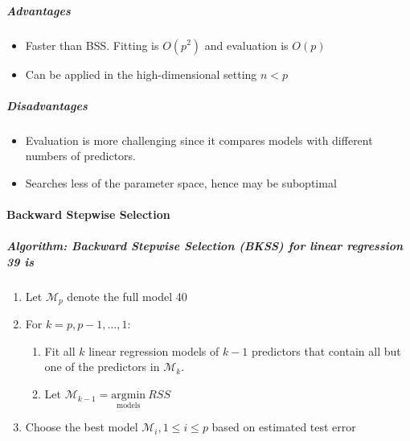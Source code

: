 \documentclass[11pt]{article}
\providecommand{\tightlist}{%
      \setlength{\itemsep}{0pt}\setlength{\parskip}{0pt}}
\begin{document}
    \hypertarget{advantages}{%
\subparagraph{Advantages}\label{advantages}}

    \begin{itemize}
\tightlist
\item
  Faster than BSS. Fitting is \(O(p^2)\) and evaluation is \(O(p)\)
\item
  Can be applied in the high-dimensional setting \(n < p\)
\end{itemize}

    \hypertarget{disadvantages}{%
\subparagraph{Disadvantages}\label{disadvantages}}

    \begin{itemize}
\tightlist
\item
  Evaluation is more challenging since it compares models with different
  numbers of predictors.
\item
  Searches less of the parameter space, hence may be suboptimal
\end{itemize}

    \hypertarget{backward-stepwise-selection}{%
\paragraph{Backward Stepwise
Selection}\label{backward-stepwise-selection}}

    \hypertarget{algorithm-backward-stepwise-selection-bkss-for-linear-regression-39-is}{%
\subparagraph{Algorithm: Backward Stepwise Selection (BKSS) for linear
regression 39
is}\label{algorithm-backward-stepwise-selection-bkss-for-linear-regression-39-is}}

    \begin{enumerate}
\def\labelenumi{\arabic{enumi}.}
\tightlist
\item
  Let \(\mathcal{M}_p\) denote the full model 40
\item
  For \(k = p, p-1, \dots, 1\):

  \begin{enumerate}
  \def\labelenumii{\arabic{enumii}.}
  \tightlist
  \item
    Fit all \(k\) linear regression models of \(k-1\) predictors that
    contain all but one of the predictors in \(\mathcal{M}_k\).
  \item
    Let
    \(\mathcal{M}_{k-1} = \underset{\text{models}}{\text{argmin}}\ RSS\)
  \end{enumerate}
\item
  Choose the best model \(\mathcal{M}_i, 1 \leqslant i \leqslant p\)
  based on estimated test error
\end{enumerate}
\end{document}
